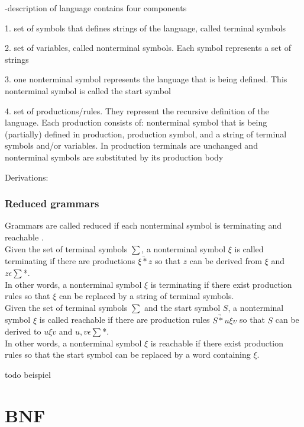 -description of language contains four components

1. set of symbols that defines strings of the language, called terminal symbols

2. set of variables, called nonterminal symbols. Each symbol represents a set of strings

3. one nonterminal symbol represents the language that is being defined. This nonterminal symbol is called the start symbol

4. set of productions/rules. They represent the recursive definition of the language. Each production consists of: nonterminal symbol that is being (partially) defined in production, production symbol, and a string of terminal symbols and/or variables.
In production terminals are unchanged and nonterminal symbols are substituted by its production body

Derivations:

\cite{AutomataTheory.2007}

\subsubsection{Reduced grammars}

Grammars are called reduced if each nonterminal symbol is terminating and reachable \cite{Cremers75}. \\
Given the set of terminal symbols $\sum$, a nonterminal symbol $\xi$ is called terminating if there are productions $\xi \underrightarrow{*} z$ so that $z$ can be derived from $\xi$ and $z \epsilon \sum$*. \\
In other words, a nonterminal symbol $\xi$ is terminating if there exist production rules so that  $\xi$ can be replaced by a string of terminal symbols. \cite{Cremers75}\\
Given the set of terminal symbols $\sum$ and the start symbol $S$, a nonterminal symbol $\xi$ is called reachable if there are production rules $S \underrightarrow{*} u\xi v$ so that $S$ can be derived to $u\xi v$ and $u,v \epsilon \sum$*. \\
In other words, a nonterminal symbol $\xi$ is reachable if there exist production rules so that the start symbol can be replaced by a word containing $\xi$. \cite{Cremers75}

todo beispiel

\section{\acf{BNF}}\label{sec:BackgroundBNF}

